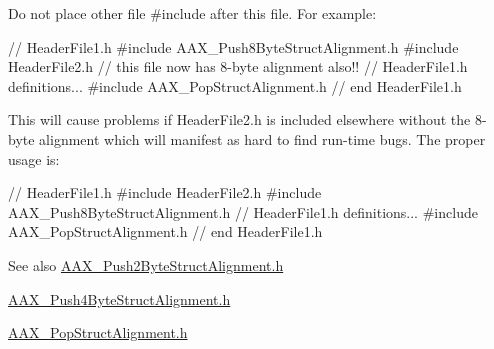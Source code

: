 \begin{DoxyItemize}
\item Do not place other file {\ttfamily \#include} after this file. For example\+: 
\begin{DoxyCode}
\textcolor{comment}{// HeaderFile1.h}
\textcolor{preprocessor}{    #include AAX\_Push8ByteStructAlignment.h}
\textcolor{preprocessor}{    #include HeaderFile2.h  // this file now has 8-byte alignment also!!}
    \textcolor{comment}{// HeaderFile1.h definitions...}
\textcolor{preprocessor}{    #include AAX\_PopStructAlignment.h}
\textcolor{preprocessor}{// end HeaderFile1.h}
\end{DoxyCode}
 This will cause problems if Header\+File2.\+h is included elsewhere without the 8-\/byte alignment which will manifest as hard to find run-\/time bugs. The proper usage is\+: 
\begin{DoxyCode}
\textcolor{comment}{// HeaderFile1.h}
\textcolor{preprocessor}{    #include HeaderFile2.h}
\textcolor{preprocessor}{    #include AAX\_Push8ByteStructAlignment.h}
        \textcolor{comment}{// HeaderFile1.h definitions...}
\textcolor{preprocessor}{    #include AAX\_PopStructAlignment.h}
\textcolor{preprocessor}{// end HeaderFile1.h}
\end{DoxyCode}
\end{DoxyItemize}
\begin{DoxySeeAlso}{See also}
\hyperlink{a00284}{A\+A\+X\+\_\+\+Push2\+Byte\+Struct\+Alignment.\+h} 

\hyperlink{a00285}{A\+A\+X\+\_\+\+Push4\+Byte\+Struct\+Alignment.\+h} 

\hyperlink{a00281}{A\+A\+X\+\_\+\+Pop\+Struct\+Alignment.\+h}
\end{DoxySeeAlso}
